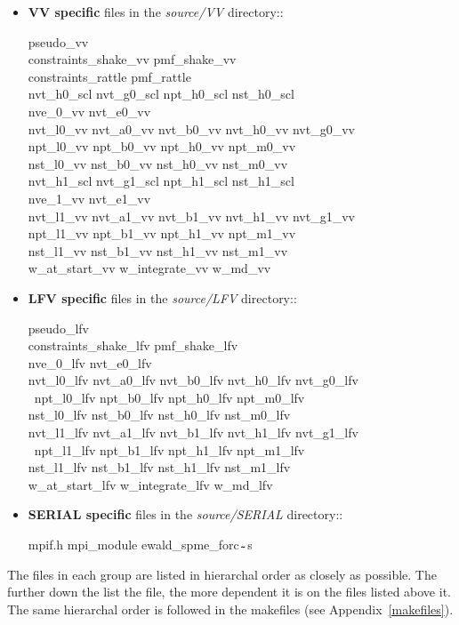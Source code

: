 \begin{itemize}
\item {\bf VV specific} files in the {\em source/VV} directory::

{\sc
pseudo\_vv \\
constraints\_shake\_vv pmf\_shake\_vv \\
constraints\_rattle pmf\_rattle \\
nvt\_h0\_scl nvt\_g0\_scl npt\_h0\_scl nst\_h0\_scl \\
nve\_0\_vv  nvt\_e0\_vv \\
nvt\_l0\_vv nvt\_a0\_vv nvt\_b0\_vv nvt\_h0\_vv nvt\_g0\_vv \\
npt\_l0\_vv npt\_b0\_vv npt\_h0\_vv npt\_m0\_vv \\
nst\_l0\_vv nst\_b0\_vv nst\_h0\_vv nst\_m0\_vv \\
nvt\_h1\_scl nvt\_g1\_scl npt\_h1\_scl nst\_h1\_scl \\
nve\_1\_vv  nvt\_e1\_vv \\
nvt\_l1\_vv nvt\_a1\_vv nvt\_b1\_vv nvt\_h1\_vv nvt\_g1\_vv \\
npt\_l1\_vv npt\_b1\_vv npt\_h1\_vv npt\_m1\_vv \\
nst\_l1\_vv nst\_b1\_vv nst\_h1\_vv nst\_m1\_vv \\
w\_at\_start\_vv w\_integrate\_vv  w\_md\_vv}

\item {\bf LFV specific} files in the {\em source/LFV} directory::

{\sc
pseudo\_lfv \\
constraints\_shake\_lfv pmf\_shake\_lfv \\
nve\_0\_lfv nvt\_e0\_lfv \\
nvt\_l0\_lfv nvt\_a0\_lfv nvt\_b0\_lfv nvt\_h0\_lfv nvt\_g0\_lfv \\\
npt\_l0\_lfv npt\_b0\_lfv npt\_h0\_lfv npt\_m0\_lfv \\
nst\_l0\_lfv nst\_b0\_lfv nst\_h0\_lfv nst\_m0\_lfv \\
nvt\_l1\_lfv nvt\_a1\_lfv nvt\_b1\_lfv nvt\_h1\_lfv nvt\_g1\_lfv \\\
npt\_l1\_lfv npt\_b1\_lfv npt\_h1\_lfv npt\_m1\_lfv \\
nst\_l1\_lfv nst\_b1\_lfv nst\_h1\_lfv nst\_m1\_lfv \\
w\_at\_start\_lfv w\_integrate\_lfv  w\_md\_lfv}

\item {\bf SERIAL specific} files in the {\em source/SERIAL} directory::

{\sc mpif.h mpi\_module ewald\_spme\_forc$_{\verb"~"}$s}

\end{itemize}
The files in each group are listed in hierarchal order as closely
as possible.  The further down the list the file, the more dependent
it is on the files listed above it.  The same hierarchal order is
followed in the makefiles (see Appendix~\ref{makefiles}).

